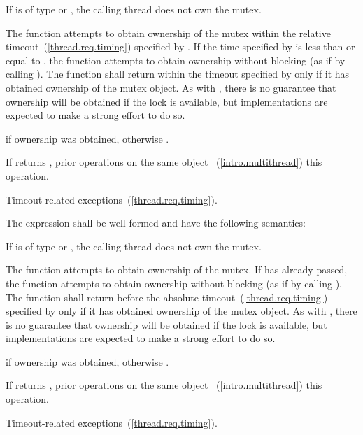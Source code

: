 \begin{itemdescr}
\pnum
\precondition If  is of type  or
, the calling thread does not
own the mutex.

\pnum
\effects The function attempts to obtain ownership of the mutex within the
relative timeout~(\ref{thread.req.timing})
specified by . If the time specified by  is less than or
equal to , the function attempts to obtain ownership without blocking (as if by calling
). The function shall return within the timeout specified by
 only if it has obtained ownership of the mutex object. \enternote As
with , there is no guarantee that ownership will be obtained if the
lock is available, but implementations are expected to make a strong effort to do so.
\exitnote

\pnum
\returntype {}

\pnum
\returns {} if ownership was obtained, otherwise .

\pnum
\sync If  returns , prior  operations
on the same object ~(\ref{intro.multithread}) this operation.

\pnum\throws Timeout-related exceptions~(\ref{thread.req.timing}).
\end{itemdescr}

\pnum
The expression  shall be well-formed and have the
following semantics:

\begin{itemdescr}
\pnum
\requires If  is of type  or
, the calling thread does not own the
mutex.

\pnum
\effects The function attempts to obtain ownership of the mutex. If
 has already passed, the function attempts to obtain ownership
without blocking (as if by calling ). The function shall
return before the absolute timeout~(\ref{thread.req.timing}) specified by
 only if it has obtained ownership of the mutex object.
\enternote As with , there is no guarantee that ownership will
be obtained if the lock is available, but implementations are expected to make a
strong effort to do so. \exitnote

\pnum\returntype {}

\pnum
\returns {} if ownership was obtained, otherwise .

\pnum
\sync If  returns , prior 
operations on the same object ~(\ref{intro.multithread})
this operation.

\pnum\throws Timeout-related exceptions~(\ref{thread.req.timing}).
\end{itemdescr}

